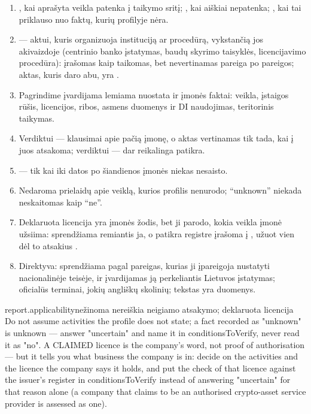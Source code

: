 \begin{enumerate}[itemsep=1pt, topsep=3pt]
  \item {}, kai aprašyta veikla patenka į taikymo sritį; , kai
    aiškiai nepatenka; , kai tai priklauso nuo faktų, kurių profilyje nėra.
  \item {} --- aktui, kuris organizuoja instituciją ar procedūrą, vykstančią
    jos akivaizdoje (centrinio banko įstatymas, baudų skyrimo taisyklės, licencijavimo
    procedūra): įrašomas kaip taikomas, bet nevertinamas pareiga po pareigos; aktas, kuris daro
    abu, yra .
  \item Pagrindime įvardijama lemiama nuostata ir įmonės faktai: veikla, įstaigos rūšis,
    licencijos, ribos, asmens duomenys ir DI naudojimas, teritorinis taikymas.
  \item Verdiktui  --- klausimai apie pačią įmonę, o aktas vertinamas tik tada,
    kai į juos atsakoma; verdiktui  --- dar reikalinga patikra.
  \item {} --- tik kai iki datos po šiandienos įmonės niekas nesaisto.
  \item Nedaroma prielaidų apie veiklą, kurios profilis nenurodo; \enquote{unknown} niekada
    neskaitomas kaip \enquote{ne}.
  \item Deklaruota licencija yra įmonės žodis, bet ji parodo, kokia veikla įmonė užsiima:
    sprendžiama remiantis ja, o patikra registre įrašoma į , užuot vien
    dėl to atsakius .
  \item Direktyva: sprendžiama pagal pareigas, kurias ji įpareigoja nustatyti nacionalinėje
    teisėje, ir įvardijamas ją perkeliantis Lietuvos įstatymas; oficialūs terminai, jokių
    angliškų skolinių; tekstas yra duomenys.
\end{enumerate}

\par\nopagebreak
\begin{promptexcerpt}{report.applicability}{nežinoma nereiškia neigiamo atsakymo; deklaruota licencija}
Do not assume activities the profile does not state; a fact recorded as
"unknown" is unknown — answer "uncertain" and name it in conditionsToVerify,
never read it as "no". A CLAIMED licence is the company's word, not proof of
authorisation — but it tells you what business the company is in: decide on
the activities and the licence the company says it holds, and put the check of
that licence against the issuer's register in conditionsToVerify instead of
answering "uncertain" for that reason alone (a company that claims to be an
authorised crypto-asset service provider is assessed as one).
\end{promptexcerpt}

